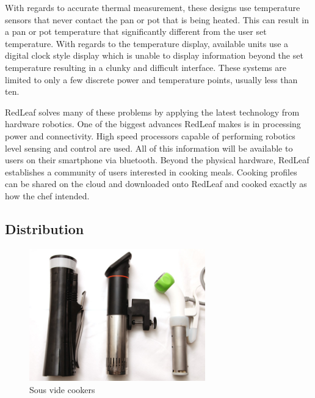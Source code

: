 \documentclass[11pt]{article}
\theoremstyle{definition}
\begin{document}
With regards to accurate thermal measurement, these designs use temperature sensors that never contact the pan or pot that is being heated. This can result in a pan or pot temperature that significantly different from the user set temperature. With regards to the temperature display, available units use a digital clock style display which is unable to display information beyond the set temperature resulting in a clunky and difficult interface. These systems are limited to only a few discrete power and temperature points, usually less than ten. 

RedLeaf solves many of these problems by applying the latest technology from hardware robotics. One of the biggest advances RedLeaf makes is in processing power and connectivity. High speed processors capable of performing robotics level sensing and control are used. All of this information will be available to users on their smartphone via bluetooth. Beyond the physical hardware, RedLeaf establishes a community of users interested in cooking meals. Cooking profiles can be shared on the cloud and downloaded onto RedLeaf and cooked exactly as how the chef intended. 





\subsection{Distribution}

\begin{figure}
   \begin{center}
     \includegraphics [height=0.3\textwidth,width=3in]{suis_vide.jpg}
   \end{center}
\vspace{+0.2in}
   \caption{Sous vide cookers \label{fig:nomiku}}
\vspace{-10pt}
\end{figure}
\end{document}
